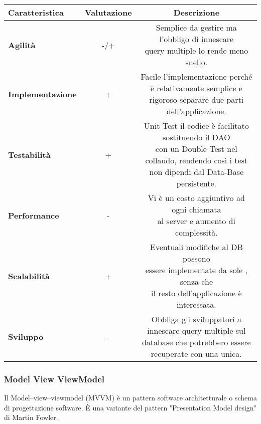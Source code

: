 {{{\begin{itemize}
				\small %
				{\renewcommand\arraystretch{1.2} %
					\begin{center} \begin{tabular}{|l|c|c|}
						\hline
						{\textbf{Caratteristica}}&{\textbf{Valutazione}}&{\textbf{Descrizione}}\\
						\hline
						\textbf{Agilità} & -/+ &  \minitab[c]{Semplice da gestire ma l'obbligo di innescare\\ query multiple lo rende meno snello.} \\
						\hline
						\textbf{Implementazione} & + &  \minitab[c]{Facile l'implementazione perché è relativamente semplice e\\ rigoroso separare due parti dell'applicazione.} \\
						\hline
						\textbf{Testabilità} & + & \minitab[c]{Unit Test il codice è facilitato sostituendo il DAO\\ con un Double Test nel collaudo, rendendo così i test\\ non dipendi dal Data-Base persistente.} \\
						\hline
						\textbf{Performance} & - &  \minitab[c]{Vi è un costo aggiuntivo ad ogni chiamata\\ al server e aumento di complessità.} \\
						\hline
						\textbf{Scalabilità} & + &  \minitab[c]{Eventuali modifiche al DB possono\\ essere implementate da sole , senza che\\ il resto dell'applicazione è interessata.} \\
						\hline
						\textbf{Sviluppo} & - &  \minitab[c]{Obbliga gli sviluppatori a innescare query multiple sul\\ database che potrebbero essere recuperate con una unica.} \\
						\hline
					\end{tabular} \end{center}
				}
			\end{itemize}
		}
	
		\subsubsection{Model View ViewModel}{
			Il Model–view–viewmodel (MVVM) è un pattern software architetturale o schema di progettazione software. È una variante del pattern "Presentation Model design" di Martin Fowler.
			
}}}
